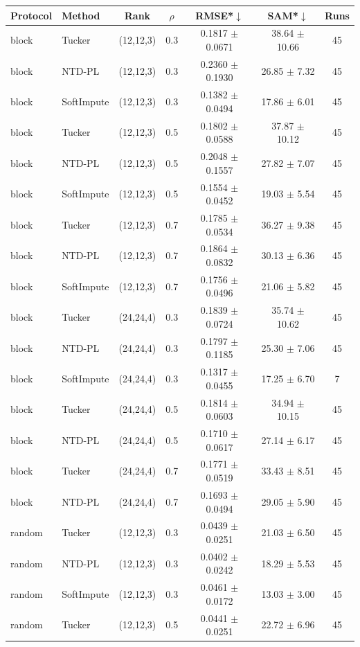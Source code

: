 \begin{tabular}{@{}l l c c c c c@{}}
\toprule
Protocol & Method & Rank & $\rho$ & RMSE*$\downarrow$ & SAM*$\downarrow$ & Runs\\
\midrule
block & Tucker & (12,12,3) & 0.3 & 0.1817 $\pm$ 0.0671 & 38.64 $\pm$ 10.66 & 45\\
block & NTD-PL & (12,12,3) & 0.3 & 0.2360 $\pm$ 0.1930 & 26.85 $\pm$ 7.32 & 45\\
block & SoftImpute & (12,12,3) & 0.3 & 0.1382 $\pm$ 0.0494 & 17.86 $\pm$ 6.01 & 45\\
block & Tucker & (12,12,3) & 0.5 & 0.1802 $\pm$ 0.0588 & 37.87 $\pm$ 10.12 & 45\\
block & NTD-PL & (12,12,3) & 0.5 & 0.2048 $\pm$ 0.1557 & 27.82 $\pm$ 7.07 & 45\\
block & SoftImpute & (12,12,3) & 0.5 & 0.1554 $\pm$ 0.0452 & 19.03 $\pm$ 5.54 & 45\\
block & Tucker & (12,12,3) & 0.7 & 0.1785 $\pm$ 0.0534 & 36.27 $\pm$ 9.38 & 45\\
block & NTD-PL & (12,12,3) & 0.7 & 0.1864 $\pm$ 0.0832 & 30.13 $\pm$ 6.36 & 45\\
block & SoftImpute & (12,12,3) & 0.7 & 0.1756 $\pm$ 0.0496 & 21.06 $\pm$ 5.82 & 45\\
block & Tucker & (24,24,4) & 0.3 & 0.1839 $\pm$ 0.0724 & 35.74 $\pm$ 10.62 & 45\\
block & NTD-PL & (24,24,4) & 0.3 & 0.1797 $\pm$ 0.1185 & 25.30 $\pm$ 7.06 & 45\\
block & SoftImpute & (24,24,4) & 0.3 & 0.1317 $\pm$ 0.0455 & 17.25 $\pm$ 6.70 & 7\\
block & Tucker & (24,24,4) & 0.5 & 0.1814 $\pm$ 0.0603 & 34.94 $\pm$ 10.15 & 45\\
block & NTD-PL & (24,24,4) & 0.5 & 0.1710 $\pm$ 0.0617 & 27.14 $\pm$ 6.17 & 45\\
block & Tucker & (24,24,4) & 0.7 & 0.1771 $\pm$ 0.0519 & 33.43 $\pm$ 8.51 & 45\\
block & NTD-PL & (24,24,4) & 0.7 & 0.1693 $\pm$ 0.0494 & 29.05 $\pm$ 5.90 & 45\\
random & Tucker & (12,12,3) & 0.3 & 0.0439 $\pm$ 0.0251 & 21.03 $\pm$ 6.50 & 45\\
random & NTD-PL & (12,12,3) & 0.3 & 0.0402 $\pm$ 0.0242 & 18.29 $\pm$ 5.53 & 45\\
random & SoftImpute & (12,12,3) & 0.3 & 0.0461 $\pm$ 0.0172 & 13.03 $\pm$ 3.00 & 45\\
random & Tucker & (12,12,3) & 0.5 & 0.0441 $\pm$ 0.0251 & 22.72 $\pm$ 6.96 & 45\\

\end{tabular}
